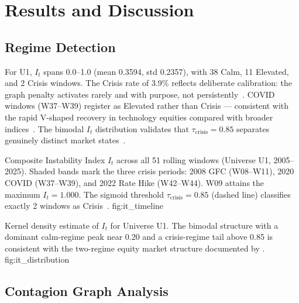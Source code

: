 
\section{Results and Discussion}
\label{sec:results}

\subsection{Regime Detection}

For U1, $I_t$ spans 0.0--1.0 (mean 0.3594, std 0.2357), with 38 Calm,
11 Elevated, and 2 Crisis windows. The Crisis rate of 3.9\% reflects
deliberate calibration: the graph penalty activates rarely and with
purpose, not persistently~\citep{ang2002,ang2004}. COVID windows
(W37--W39) register as Elevated rather than Crisis — consistent with
the rapid V-shaped recovery in technology equities compared with broader
indices~\citep{longin2001,guidolin2007}. The bimodal $I_t$ distribution
validates that $\tau_{\text{crisis}} = 0.85$ separates genuinely distinct
market states~\citep{ang2002}.

  {Composite Instability Index $I_t$ across all 51 rolling windows
   (Universe U1, 2005--2025). Shaded bands mark the three crisis
   periods: 2008 GFC (W08--W11), 2020 COVID (W37--W39), and 2022
   Rate Hike (W42--W44). W09 attains the maximum $I_t = 1.000$.
   The sigmoid threshold $\tau_{\text{crisis}} = 0.85$ (dashed line)
   classifies exactly 2 windows as Crisis~\citep{ang2002,hamilton1989}.}
  {fig:it_timeline}

  {Kernel density estimate of $I_t$ for Universe U1. The bimodal
   structure with a dominant calm-regime peak near 0.20 and a
   crisis-regime tail above 0.85 is consistent with the two-regime
   equity market structure documented by \citet{ang2002}.}
  {fig:it_distribution}

\subsection{Contagion Graph Analysis}

